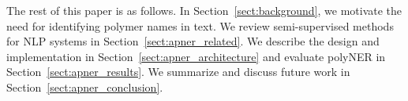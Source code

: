 The rest of this paper is as follows. 
In Section~\ref{sect:background}, we motivate the need for identifying polymer names in
text. 
We review semi-supervised methods for NLP systems in
Section~\ref{sect:apner_related}. 
We describe the design and implementation in Section~\ref{sect:apner_architecture} and evaluate polyNER
in Section~\ref{sect:apner_results}. We summarize and discuss future work in Section~\ref{sect:apner_conclusion}.
